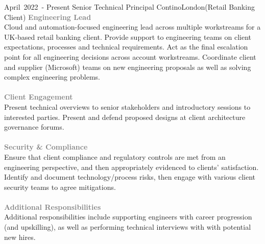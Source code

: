 
\edef\hc{\string:}

\cventry %
  {\mbox{April 2022 -} \mbox{Present}}
  {Senior Technical Principal}
  {Contino}{London}{(Retail Banking Client)}
  {
    \textcolor{gray}{\textbf{Engineering Lead}}\\ 
    Cloud and automation-focused engineering lead across multiple workstreams 
    for a UK-based retail banking client. Provide support to engineering teams
    on client expectations, processes and technical requirements.
    Act as the final escalation point for all engineering decisions across 
    account workstreams. Coordinate client and supplier (Microsoft) teams on
    new engineering proposals as well as solving complex engineering problems.\\\\
    \textcolor{gray}{\textbf{Client Engagement}}\\ 
    Present technical overviews to senior stakeholders and introductory sessions
    to interested parties. Present and defend proposed designs at client 
    architecture governance forums.\\\\
    \textcolor{gray}{\textbf{Security \& Compliance}}\\ 
    Ensure that client compliance and regulatory controls are met from an engineering 
    perspective, and then appropriately evidenced to clients' satisfaction.
    Identify and document technology/process risks, then engage with various client
    security teams to agree mitigations.\\\\
    \textcolor{gray}{\textbf{Additional Responsibilities}}\\ 
    Additional responsibilities include supporting engineers with career
    progression (and upskilling), as well as performing technical interviews with
    with potential new hires.\\
  }

